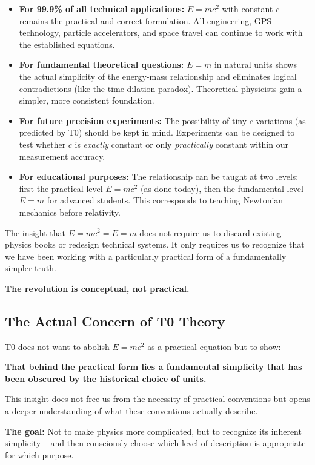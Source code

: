 	\begin{itemize}
		\item \textbf{For 99.9\% of all technical applications:} \( E = mc^2 \) with constant \( c \) remains the practical and correct formulation. All engineering, GPS technology, particle accelerators, and space travel can continue to work with the established equations.
		
		\item \textbf{For fundamental theoretical questions:} \( E = m \) in natural units shows the actual simplicity of the energy-mass relationship and eliminates logical contradictions (like the time dilation paradox). Theoretical physicists gain a simpler, more consistent foundation.
		
		\item \textbf{For future precision experiments:} The possibility of tiny \( c \) variations (as predicted by T0) should be kept in mind. Experiments can be designed to test whether \( c \) is \textit{exactly} constant or only \textit{practically} constant within our measurement accuracy.
		
		\item \textbf{For educational purposes:} The relationship can be taught at two levels: first the practical level \( E = mc^2 \) (as done today), then the fundamental level \( E = m \) for advanced students. This corresponds to teaching Newtonian mechanics before relativity.
	\end{itemize}
	
	\begin{tcolorbox}[colback=yellow!10!white,colframe=yellow!75!black,title=The Peaceful Revolution]
		The insight that \( E = mc^2 = E = m \) does not require us to discard existing physics books or redesign technical systems. It only requires us to recognize that we have been working with a particularly practical form of a fundamentally simpler truth.
		
		\textbf{The revolution is conceptual, not practical.}
	\end{tcolorbox}
	
	\subsection{The Actual Concern of T0 Theory}
	
	\begin{tcolorbox}[colback=orange!10!white,colframe=orange!75!black,title=The True Concern of T0 Theory]
		T0 does not want to abolish \( E = mc^2 \) as a practical equation but to show:
		
		\textbf{That behind the practical form lies a fundamental simplicity that has been obscured by the historical choice of units.}
		
		This insight does not free us from the necessity of practical conventions but opens a deeper understanding of what these conventions actually describe.
		
		\textbf{The goal:} Not to make physics more complicated, but to recognize its inherent simplicity – and then consciously choose which level of description is appropriate for which purpose.
	\end{tcolorbox}
	

